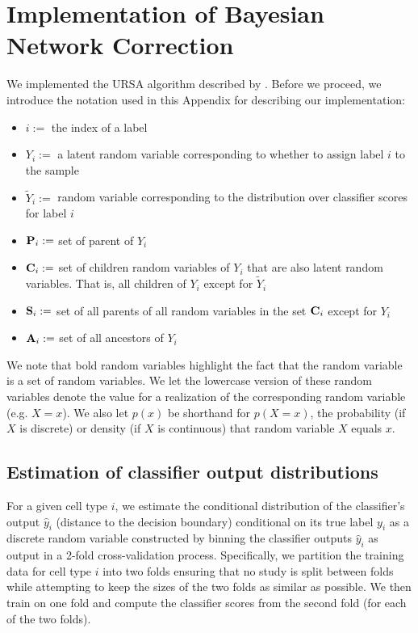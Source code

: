 \chapter{Implementation of Bayesian Network Correction } \label{app:bnc}

We implemented the URSA algorithm described by \cite{Lee2013}.  Before we proceed, we introduce the notation used in this Appendix for describing our implementation:
\begin{itemize}
\item $i := $ the index of a label
\item $Y_i := $ a latent random variable corresponding to whether to assign label $i$ to the sample
\item $\tilde{Y}_i := $ random variable corresponding to the distribution over classifier scores for label $i$ 
\item $\bold{P}_i := $ set of parent of $Y_i$
\item  $\bold{C}_i := $ set of children random variables of $Y_i$ that are also latent random variables. That is, all children of $Y_i$ except for $\tilde{Y}_i$
\item  $\bold{S}_i := $ set of all parents of all random variables in the set $\bold{C}_i$ except for $Y_i$
\item $\bold{A}_i := $ set of all ancestors of $Y_i$
\end{itemize}
We note that bold random variables highlight the fact that the random variable is a set of random variables. We let the lowercase version of these random variables denote the value for a realization of the corresponding random variable (e.g. $X = x$). We also let $p(x)$ be shorthand for $p(X = x)$, the probability (if $X$ is discrete) or density (if $X$ is continuous) that random variable $X$ equals $x$. 


\section{Estimation of classifier output distributions }

For a given cell type $i$, we estimate the conditional distribution of the classifier's output $\hat{y}_i$ (distance to the decision boundary) conditional on its true label $y_i$ as a discrete random variable constructed by binning the classifier outputs  $\hat{y}_i$ as output in a 2-fold cross-validation process. Specifically, we partition the training data for cell type $i$ into two folds ensuring that no study is split between folds while attempting to keep the sizes of the two folds as similar as possible. We then train on one fold and compute the classifier scores from the second fold (for each of the two folds).

